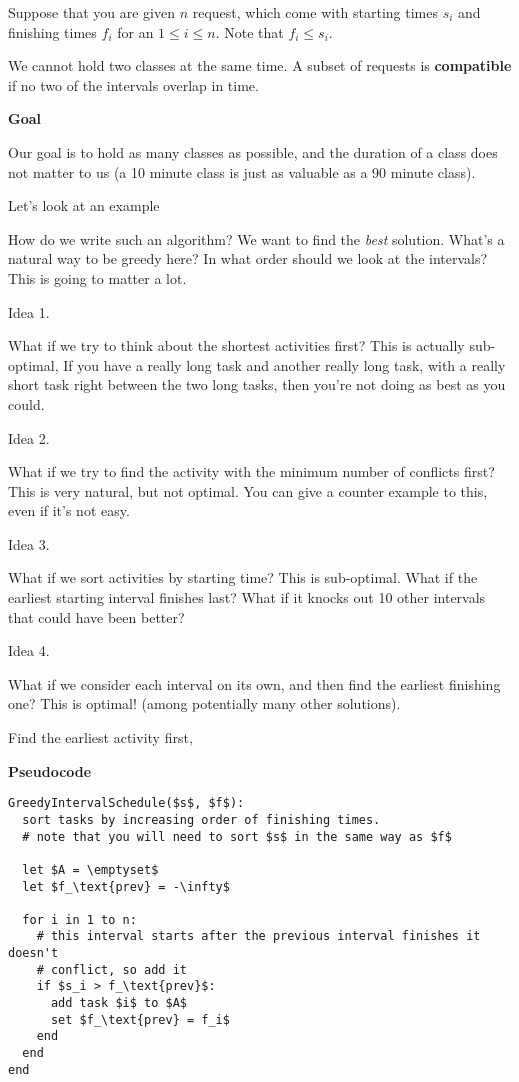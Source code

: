 \documentclass[12pt]{article}
\begin{document}
  Suppose that you are given $n$ request, which come with starting times $s_i$ and
  finishing times $f_i$ for an $1 \le i \le n$. Note that $f_i \le s_i$.

  We cannot hold two classes at the same time. A subset of requests is {\bf
  compatible} if no two of the intervals overlap in time.

  {\bf Goal}

  Our goal is to hold as many classes as possible, and the duration of a class
  does not matter to us (a 10 minute class is just as valuable as a 90 minute
  class).

  Let's look at an example



  How do we write such an algorithm? We want to find the {\it best} solution.
  What's a natural way to be greedy here? In what order should we look at the
  intervals? This is going to matter a lot.

  {\sc Idea 1}.

  What if we try to think about the shortest activities first? This is actually
  sub-optimal, If you have a really long task and another really long task, with a
  really short task right between the two long tasks, then you're not doing as
  best as you could.

  {\sc Idea 2}.

  What if we try to find the activity with the minimum number of conflicts first?
  This is very natural, but not optimal. You can give a counter example to this,
  even if it's not easy.

  {\sc Idea 3}.

  What if we sort activities by starting time? This is sub-optimal. What if the
  earliest starting interval finishes last? What if it knocks out 10 other
  intervals that could have been better?

  {\sc Idea 4}.

  What if we consider each interval on its own, and then find the earliest
  finishing one? This is optimal! (among potentially many other solutions).

  Find the earliest activity first,

  {\bf Pseudocode}

  \begin{lstlisting}
GreedyIntervalSchedule($s$, $f$):
  sort tasks by increasing order of finishing times.
  # note that you will need to sort $s$ in the same way as $f$

  let $A = \emptyset$
  let $f_\text{prev} = -\infty$

  for i in 1 to n:
    # this interval starts after the previous interval finishes it doesn't
    # conflict, so add it
    if $s_i > f_\text{prev}$:
      add task $i$ to $A$
      set $f_\text{prev} = f_i$
    end
  end
end
  \end{lstlisting}
\end{document}
